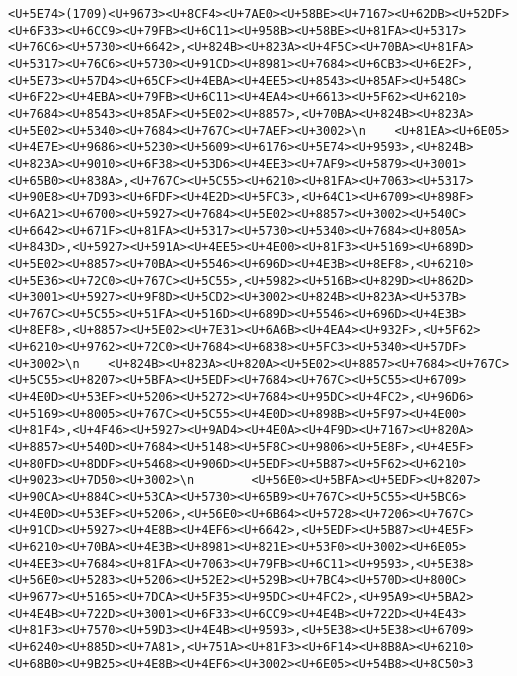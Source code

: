 \documentclass[
]{article}
\begin{document}
\begin{verbatim}
<U+5E74>(1709)<U+9673><U+8CF4><U+7AE0><U+58BE><U+7167><U+62DB><U+52DF><U+6F33><U+6CC9><U+79FB><U+6C11><U+958B><U+58BE><U+81FA><U+5317><U+76C6><U+5730><U+6642>,<U+824B><U+823A><U+4F5C><U+70BA><U+81FA><U+5317><U+76C6><U+5730><U+91CD><U+8981><U+7684><U+6CB3><U+6E2F>,<U+5E73><U+57D4><U+65CF><U+4EBA><U+4EE5><U+8543><U+85AF><U+548C><U+6F22><U+4EBA><U+79FB><U+6C11><U+4EA4><U+6613><U+5F62><U+6210><U+7684><U+8543><U+85AF><U+5E02><U+8857>,<U+70BA><U+824B><U+823A><U+5E02><U+5340><U+7684><U+767C><U+7AEF><U+3002>\n    <U+81EA><U+6E05><U+4E7E><U+9686><U+5230><U+5609><U+6176><U+5E74><U+9593>,<U+824B><U+823A><U+9010><U+6F38><U+53D6><U+4EE3><U+7AF9><U+5879><U+3001><U+65B0><U+838A>,<U+767C><U+5C55><U+6210><U+81FA><U+7063><U+5317><U+90E8><U+7D93><U+6FDF><U+4E2D><U+5FC3>,<U+64C1><U+6709><U+898F><U+6A21><U+6700><U+5927><U+7684><U+5E02><U+8857><U+3002><U+540C><U+6642><U+671F><U+81FA><U+5317><U+5730><U+5340><U+7684><U+805A><U+843D>,<U+5927><U+591A><U+4EE5><U+4E00><U+81F3><U+5169><U+689D><U+5E02><U+8857><U+70BA><U+5546><U+696D><U+4E3B><U+8EF8>,<U+6210><U+5E36><U+72C0><U+767C><U+5C55>,<U+5982><U+516B><U+829D><U+862D><U+3001><U+5927><U+9F8D><U+5CD2><U+3002><U+824B><U+823A><U+537B><U+767C><U+5C55><U+51FA><U+516D><U+689D><U+5546><U+696D><U+4E3B><U+8EF8>,<U+8857><U+5E02><U+7E31><U+6A6B><U+4EA4><U+932F>,<U+5F62><U+6210><U+9762><U+72C0><U+7684><U+6838><U+5FC3><U+5340><U+57DF><U+3002>\n    <U+824B><U+823A><U+820A><U+5E02><U+8857><U+7684><U+767C><U+5C55><U+8207><U+5BFA><U+5EDF><U+7684><U+767C><U+5C55><U+6709><U+4E0D><U+53EF><U+5206><U+5272><U+7684><U+95DC><U+4FC2>,<U+96D6><U+5169><U+8005><U+767C><U+5C55><U+4E0D><U+898B><U+5F97><U+4E00><U+81F4>,<U+4F46><U+5927><U+9AD4><U+4E0A><U+4F9D><U+7167><U+820A><U+8857><U+540D><U+7684><U+5148><U+5F8C><U+9806><U+5E8F>,<U+4E5F><U+80FD><U+8DDF><U+5468><U+906D><U+5EDF><U+5B87><U+5F62><U+6210><U+9023><U+7D50><U+3002>\n        <U+56E0><U+5BFA><U+5EDF><U+8207><U+90CA><U+884C><U+53CA><U+5730><U+65B9><U+767C><U+5C55><U+5BC6><U+4E0D><U+53EF><U+5206>,<U+56E0><U+6B64><U+5728><U+7206><U+767C><U+91CD><U+5927><U+4E8B><U+4EF6><U+6642>,<U+5EDF><U+5B87><U+4E5F><U+6210><U+70BA><U+4E3B><U+8981><U+821E><U+53F0><U+3002><U+6E05><U+4EE3><U+7684><U+81FA><U+7063><U+79FB><U+6C11><U+9593>,<U+5E38><U+56E0><U+5283><U+5206><U+52E2><U+529B><U+7BC4><U+570D><U+800C><U+9677><U+5165><U+7DCA><U+5F35><U+95DC><U+4FC2>,<U+95A9><U+5BA2><U+4E4B><U+722D><U+3001><U+6F33><U+6CC9><U+4E4B><U+722D><U+4E43><U+81F3><U+7570><U+59D3><U+4E4B><U+9593>,<U+5E38><U+5E38><U+6709><U+6240><U+885D><U+7A81>,<U+751A><U+81F3><U+6F14><U+8B8A><U+6210><U+68B0><U+9B25><U+4E8B><U+4EF6><U+3002><U+6E05><U+54B8><U+8C50>3 
\end{verbatim}
\end{document}

